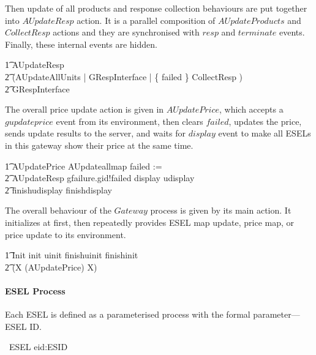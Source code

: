 Then update of all products and response collection behaviours are put together into $AUpdateResp$ action. It is a parallel composition of $AUpdateProducts$ and $CollectResp$ actions and they are synchronised with $resp$ and $terminate$ events. Finally, these internal events are hidden.
\begin{circusaction}
        \t1 AUpdateResp \circdef \\
            \t2 (AUpdateAllUnits \lpar \emptyset | GRespInterface | \{ failed \} \rpar CollectResp ) \\
            \t2 \circhide GRespInterface \\
\end{circusaction}

The overall price update action is given in $AUpdatePrice$, which accepts a $gupdateprice$ event from its environment, then clears $failed$, updates the price, sends update results to the server, and waits for $display$ event to make all ESELs in this gateway show their price at the same time.
\begin{circusaction}
        \t1 AUpdatePrice \circdef AUpdateallmap \circseq failed := \emptyset \circseq \\
            \t2 AUpdateResp \circseq gfailure.gid!failed \then display \then udisplay \then \\
            \t2 finishudisplay \then finishdisplay \then \Skip \\ 
\end{circusaction}

The overall behaviour of the $Gateway$ process is given by its main action. It initializes at first, then repeatedly provides ESEL map update, price map, or price update to its environment.
\begin{circusaction}
	\t1 \circspot \lschexpract Init \rschexpract \circseq init \then uinit \then finishuinit \then finishinit \then \Skip \circseq \\
    \t2 (\circmu X \circspot (AUpdatePrice) \circseq X) \\
\end{circusaction}

\begin{circus}
	\circend
\end{circus}

%
\paragraph{ESEL Process}

Each ESEL is defined as a parameterised process with the formal parameter---ESEL ID.
\begin{circus}
	\circprocess\ ESEL \circdef eid:ESID \circspot \circbegin \\
\end{circus}

